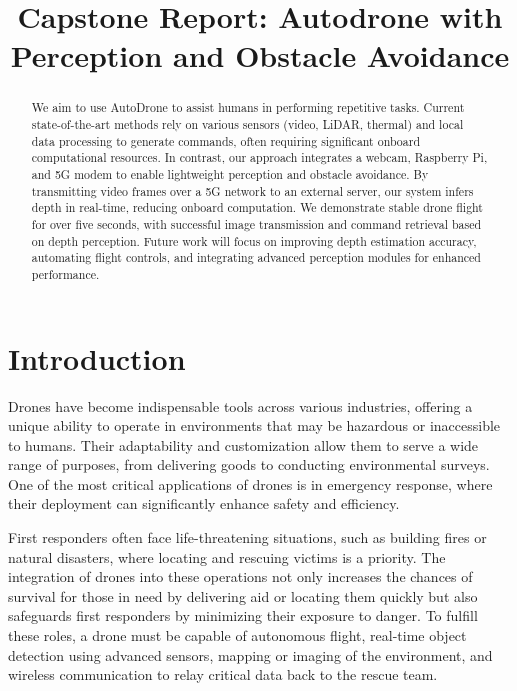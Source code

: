 \documentclass[conference]{IEEEtran}
\begin{document}
\title{Capstone Report: Autodrone with Perception and Obstacle Avoidance}

\author{
}

\maketitle

\begin{abstract}
We aim to use AutoDrone to assist humans in performing repetitive tasks. Current state-of-the-art methods rely on various sensors (video, LiDAR, thermal) and local data processing to generate commands, often requiring significant onboard computational resources. In contrast, our approach integrates a webcam, Raspberry Pi, and 5G modem to enable lightweight perception and obstacle avoidance. By transmitting video frames over a 5G network to an external server, our system infers depth in real-time, reducing onboard computation. We demonstrate stable drone flight for over five seconds, with successful image transmission and command retrieval based on depth perception. Future work will focus on improving depth estimation accuracy, automating flight controls, and integrating advanced perception modules for enhanced performance.
\end{abstract}


\section{Introduction}
Drones have become indispensable tools across various industries, offering a unique ability to operate in environments that may be hazardous or inaccessible to humans. Their adaptability and customization allow them to serve a wide range of purposes, from delivering goods to conducting environmental surveys. One of the most critical applications of drones is in emergency response, where their deployment can significantly enhance safety and efficiency.

First responders often face life-threatening situations, such as building fires or natural disasters, where locating and rescuing victims is a priority. The integration of drones into these operations not only increases the chances of survival for those in need by delivering aid or locating them quickly but also safeguards first responders by minimizing their exposure to danger. To fulfill these roles, a drone must be capable of autonomous flight, real-time object detection using advanced sensors, mapping or imaging of the environment, and wireless communication to relay critical data back to the rescue team.
\end{document}
